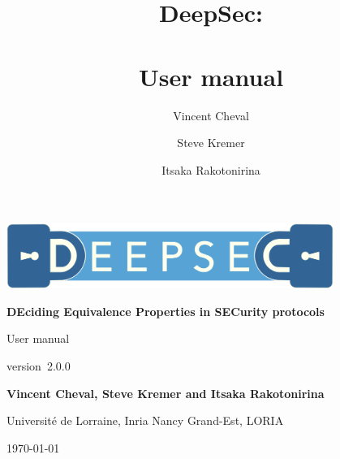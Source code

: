 \documentclass[a4paper,11pt]{article}
\title{DeepSec:\\\\User manual}
\author[1]{Vincent Cheval}
\author[1]{Steve Kremer}
\author[1]{Itsaka Rakotonirina}
\affil[2]{Inria Nancy, LORIA, Universit\'e de Lorraine, France}
\newcommand{\version}{2.0.0}
\begin{document}
\begin{titlepage}

  \color{titlepagetextcolor}
  \begin{center}
    \vspace*{1cm}
    \pagecolor{titlepagebgcolor}

    \includegraphics[width=0.8\textwidth]{logo/logo-full.png}


    \textbf{DEciding Equivalence Properties in SECurity protocols}

    \vspace{0.5cm}
    {\Large User manual}

    version~\version

    \vspace{1.5cm}

    \textbf{Vincent Cheval, Steve Kremer and Itsaka Rakotonirina}

    \medskip
    Université de Lorraine, Inria Nancy Grand-Est, LORIA

    \medskip

    \today


     \end{center}
   \color{black}
 \end{titlepage}

\pagecolor{white}



\newpage

\tableofcontents

\newpage

 \newpage
 \newpage
 \newpage
 \newpage
 \newpage

\printbibliography
\end{document}
